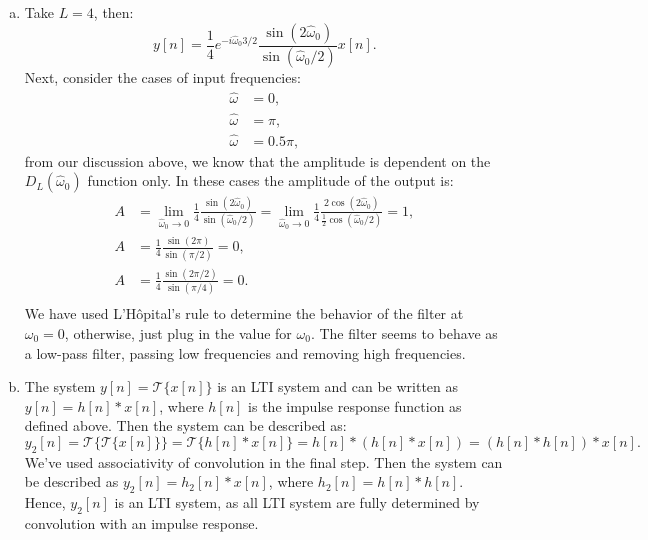 \begin{enumerate}
\begin{enumerate}[a)]
          \item Take $L=4$, then:
                \[ y[n]=\frac{1}{4}e^{-i\hat{\omega}_{0}3/2}\frac{\sin(2\hat{\omega}_{0})}{\sin(\hat{\omega}_{0}/2)}x[n]. \]
                Next, consider the cases of input frequencies:
                \begin{align*}
                  \hat{\omega} & =0,      \\
                  \hat{\omega} & =\pi,    \\
                  \hat{\omega} & =0.5\pi,
                \end{align*}
                from our discussion above, we know that the amplitude is dependent on
                the $D_{L}(\hat{\omega}_{0})$ function only.
                In these cases the amplitude of the output is:
                \begin{align*}
                  A & =\lim_{\hat{\omega}_{0}\to 0}\frac{1}{4}\frac{\sin(2\hat{\omega}_{0})}{\sin(\hat{\omega}_{0}/2)} = \lim_{\hat{\omega}_{0}\to 0}\frac{1}{4}\frac{2\cos(2\hat{\omega}_{0})}{\frac{1}{2}\cos(\hat{\omega}_{0}/2)} = 1, \\
                  A & =\frac{1}{4}\frac{\sin(2\pi)}{\sin(\pi/2)} = 0,                                                                                                                                                                     \\
                  A & =\frac{1}{4}\frac{\sin(2\pi/2)}{\sin(\pi/4)} = 0.                                                                                                                                                                   \\
                \end{align*}
                We have used L'Hôpital's rule to determine the behavior of the
                filter at $\omega_{0} = 0$, otherwise, just plug in the value for $\omega_0$.
                The filter seems to behave as a low-pass filter, passing
                low frequencies and removing high frequencies.

          \item The system $y[n]=\mathcal{T}\{x[n]\}$ is an LTI system and can be written
                as $y[n]=h[n]*x[n]$, where $h[n]$ is the impulse response function as defined above.
                Then the system can be described as:
                \[ y_{2}[n]=\mathcal{T}\{\mathcal{T}\{x[n]\}\}=\mathcal{T}\{h[n]*x[n]\}=h[n]*(h[n]*x[n])=(h[n]*h[n])*x[n]. \]
                We've used associativity of convolution in the final step.
                Then the system can be described as $y_{2}[n]=h_{2}[n]*x[n]$,
                where $h_{2}[n] = h[n]*h[n]$. Hence, $y_{2}[n]$ is an LTI system,
                as all LTI system are fully determined by convolution with an impulse response.


\end{enumerate}
\end{enumerate}
